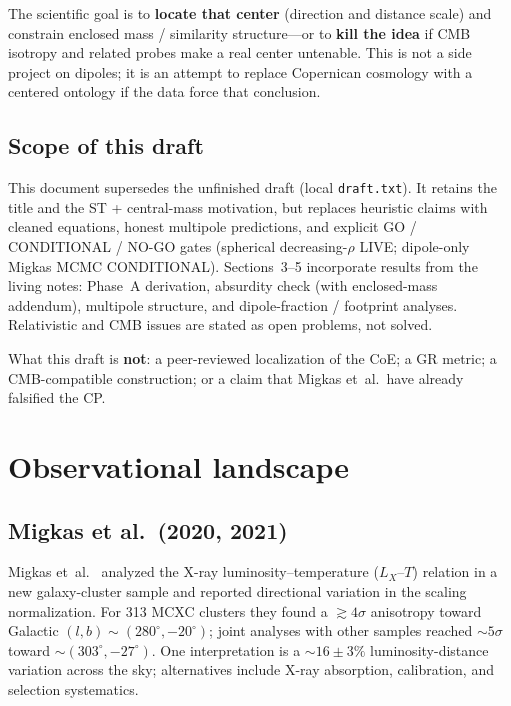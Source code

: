 \documentclass[11pt,a4paper]{article}
\begin{document}
The scientific goal is to \textbf{locate that center} (direction and distance scale) and constrain enclosed mass / similarity structure---or to \textbf{kill the idea} if CMB isotropy and related probes make a real center untenable. This is not a side project on dipoles; it is an attempt to replace Copernican cosmology with a centered ontology if the data force that conclusion.

\subsection{Scope of this draft}

This document supersedes the unfinished draft (local \texttt{draft.txt}). It retains the title and the ST + central-mass motivation, but replaces heuristic claims with cleaned equations, honest multipole predictions, and explicit GO / CONDITIONAL / NO-GO gates (spherical decreasing-\(\rho\) LIVE; dipole-only Migkas MCMC CONDITIONAL). Sections~3--5 incorporate results from the living notes: Phase~A derivation, absurdity check (with enclosed-mass addendum), multipole structure, and dipole-fraction / footprint analyses. Relativistic and CMB issues are stated as open problems, not solved.

What this draft is \textbf{not}: a peer-reviewed localization of the CoE; a GR metric; a CMB-compatible construction; or a claim that Migkas et~al.\ have already falsified the CP.

\section{Observational landscape}

\subsection{Migkas et al.\ (2020, 2021)}

Migkas et~al.\ \cite{Migkas2020} analyzed the X-ray luminosity--temperature (\(L_X\)--\(T\)) relation in a new galaxy-cluster sample and reported directional variation in the scaling normalization. For 313 MCXC clusters they found a \(\gtrsim 4\sigma\) anisotropy toward Galactic \((l,b)\sim(280^\circ,-20^\circ)\); joint analyses with other samples reached \(\sim 5\sigma\) toward \(\sim(303^\circ,-27^\circ)\). One interpretation is a \(\sim 16\pm 3\%\) luminosity-distance variation across the sky; alternatives include X-ray absorption, calibration, and selection systematics.
\end{document}
